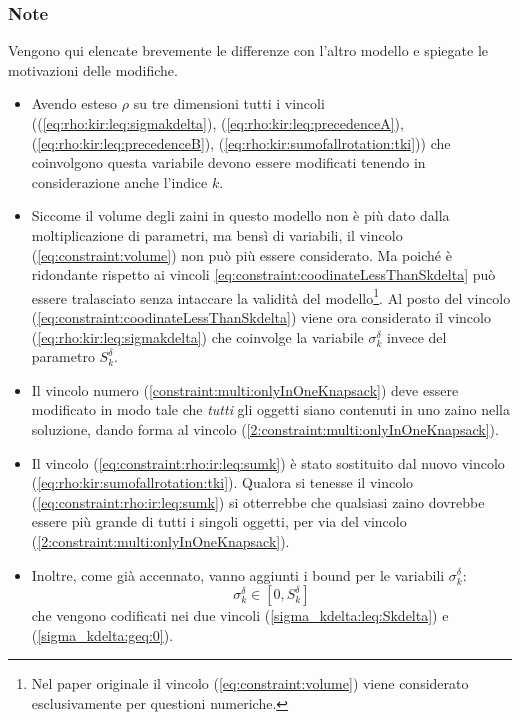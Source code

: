 \documentclass{scrartcl}
\begin{document}
\subsubsection{Note}
Vengono qui elencate brevemente le differenze con l'altro modello e spiegate le motivazioni delle modifiche.
\begin{itemize}
\item Avendo esteso $\rho$ su tre dimensioni tutti i vincoli ((\ref{eq:rho:kir:leq:sigmakdelta}), (\ref{eq:rho:kir:leq:precedenceA}), (\ref{eq:rho:kir:leq:precedenceB}), (\ref{eq:rho:kir:sumofallrotation:tki})) che coinvolgono questa variabile devono essere modificati tenendo in considerazione anche l'indice $k$.

\item Siccome il volume degli zaini in questo modello non è più dato dalla moltiplicazione di parametri, ma bensì di variabili, il vincolo
(\ref{eq:constraint:volume}) non può più essere considerato. 
Ma poiché è ridondante rispetto ai vincoli \ref{eq:constraint:coodinateLessThanSkdelta}
può essere tralasciato senza intaccare la validità del modello\footnote{Nel paper originale il vincolo (\ref{eq:constraint:volume}) viene considerato esclusivamente per questioni numeriche.}. Al posto del vincolo (\ref{eq:constraint:coodinateLessThanSkdelta}) viene ora considerato il vincolo (\ref{eq:rho:kir:leq:sigmakdelta}) che coinvolge la variabile $\sigma_k^\delta$ invece del parametro $S_k^\delta$.

\item Il vincolo numero (\ref{constraint:multi:onlyInOneKnapsack}) deve essere modificato in modo tale che \emph{tutti} gli oggetti siano contenuti in uno zaino nella soluzione, dando forma al vincolo (\ref{2:constraint:multi:onlyInOneKnapsack}).

\item Il vincolo (\ref{eq:constraint:rho:ir:leq:sumk}) è stato sostituito dal nuovo vincolo (\ref{eq:rho:kir:sumofallrotation:tki}). Qualora si tenesse il vincolo (\ref{eq:constraint:rho:ir:leq:sumk}) si otterrebbe che qualsiasi zaino  dovrebbe essere più grande di tutti i singoli oggetti, per via  del vincolo (\ref{2:constraint:multi:onlyInOneKnapsack}).

\item Inoltre, come già accennato, vanno aggiunti i bound per le variabili $\sigma_k^\delta$:
\begin{equation}
\sigma_k^\delta \in [ 0, S_k^\delta ]
\end{equation}
che vengono codificati nei due vincoli
(\ref{sigma_kdelta:leq:Skdelta}) e (\ref{sigma_kdelta:geq:0}).
\end{itemize}
\end{document}
